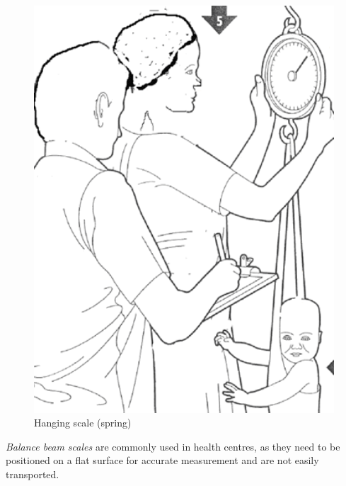 \documentclass[12pt,]{book}
\theoremstyle{definition}
\theoremstyle{definition}
\theoremstyle{definition}
\theoremstyle{remark}
\begin{document}
\begin{figure}

{\centering \includegraphics[width=5.08in]{images/hangingScale} 

}

\caption{Hanging scale (spring)}\label{fig:weight2}
\end{figure}

\emph{Balance beam scales} are commonly used in health centres, as they
need to be positioned on a flat surface for accurate measurement and are
not easily transported.
\end{document}
